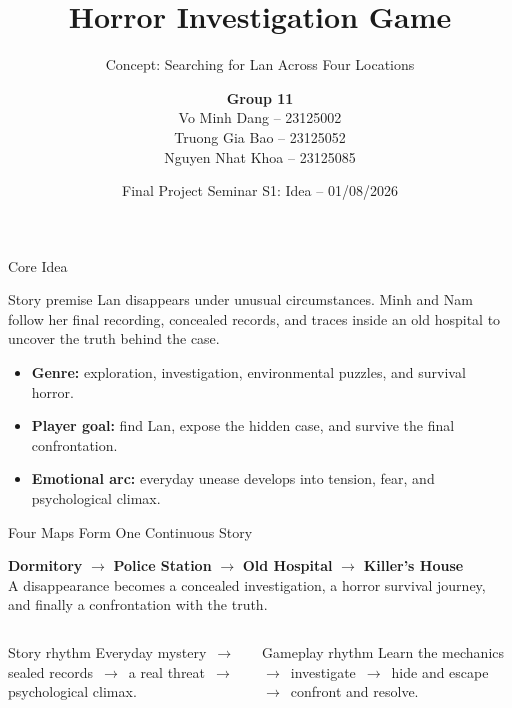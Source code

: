 \documentclass[aspectratio=169,10pt]{beamer}
\title{Horror Investigation Game}
\subtitle{Concept: Searching for Lan Across Four Locations}
\author{\textbf{Group 11}\\[0.25cm]\small
Vo Minh Dang -- 23125002\\
Truong Gia Bao -- 23125052\\
Nguyen Nhat Khoa -- 23125085}
\institute{Advanced Program (APCS) \\ 3D Visualization and Game Development -- 23TT}
\date{Final Project Seminar S1: Idea -- 01/08/2026}
\begin{document}
\begin{frame}
  \titlepage
\end{frame}

\begin{frame}{Core Idea}
  \begin{block}{Story premise}
    Lan disappears under unusual circumstances. Minh and Nam follow her final recording, concealed records, and traces inside an old hospital to uncover the truth behind the case.
  \end{block}

  \vspace{0.35cm}
  \begin{itemize}
    \item \textbf{Genre:} exploration, investigation, environmental puzzles, and survival horror.
    \item \textbf{Player goal:} find Lan, expose the hidden case, and survive the final confrontation.
    \item \textbf{Emotional arc:} everyday unease develops into tension, fear, and psychological climax.
  \end{itemize}
\end{frame}

\begin{frame}{Four Maps Form One Continuous Story}
  \begin{center}
    \colorbox{GameLight}{\parbox{0.92\linewidth}{\centering\large
      \textbf{Dormitory} \quad$\longrightarrow$\quad
      \textbf{Police Station} \quad$\longrightarrow$\quad
      \textbf{Old Hospital} \quad$\longrightarrow$\quad
      \textbf{Killer's House}\\[0.25cm]
      A disappearance becomes a concealed investigation, a horror survival journey, and finally a confrontation with the truth.}}
  \end{center}

  \vspace{0.35cm}
  \begin{columns}[T,onlytextwidth]
    \begin{block}{Story rhythm}
      Everyday mystery \,$\rightarrow$\, sealed records \,$\rightarrow$\, a real threat \,$\rightarrow$\, psychological climax.
    \end{block}
    \begin{block}{Gameplay rhythm}
      Learn the mechanics \,$\rightarrow$\, investigate \,$\rightarrow$\, hide and escape \,$\rightarrow$\, confront and resolve.
    \end{block}
  \end{columns}
\end{frame}
\end{document}
